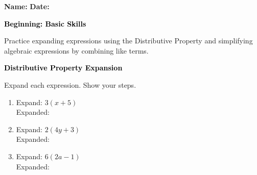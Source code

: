\documentclass[12pt, letterpaper, fleqn]{article}
\newcommand{\blanklong}{\underline{\hspace{6.5cm}}}
\begin{document}
\textbf{Name:} \underline{\hspace{5cm}}
\hfill
\textbf{Date:} \underline{\hspace{3cm}}\\

\begin{tcolorbox}[colback=black!10]
    \large\textcolor{black}{\textbf{Beginning: Basic Skills}}
\end{tcolorbox}

\vspace{3mm}
\noindent
Practice expanding expressions using the Distributive Property and simplifying algebraic expressions by combining like terms.

\vspace{4mm}

\begin{tcolorbox}[colback=black!10]
\large\textcolor{black}{\textbf{Distributive Property Expansion}}
\end{tcolorbox}

\noindent
Expand each expression. Show your steps.

\vspace{3mm}

\begin{enumerate}[itemsep=2.2cm, leftmargin=0.6cm]

\item Expand: $3(x + 5)$ \\
Expanded: \blanklong

\vspace{2cm}

\item Expand: $2(4y + 3)$ \\
Expanded: \blanklong

\vspace{2cm}

\item Expand: $6(2a - 1)$ \\
Expanded: \blanklong

\vspace{2cm}

\end{enumerate}

\newpage
\end{document}
